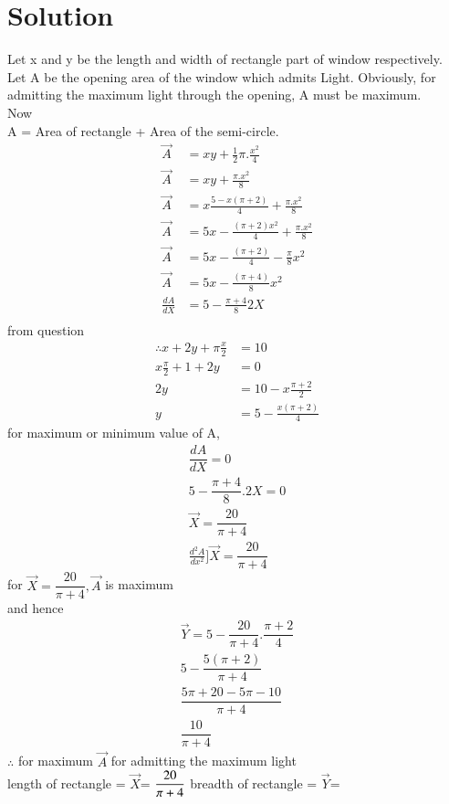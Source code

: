 \documentclass[journal,12pt,twocolumn]{IEEEtran}
\begin{document}
\section{Solution}
Let x and y be the length and width of rectangle part of window respectively.\\
Let A be the opening area of the window which admits Light. Obviously, for admitting the maximum light through the opening, A must be maximum.\\
Now \\A = Area of rectangle + Area of the semi-circle.
\begin{align}
    \vec A&= xy+\frac{1}{2}\pi.\frac{x^2}{4}\\
    \vec A&= xy+\frac{\pi.x^2}{8}\\
     \vec A&= x{\frac{5-x(\pi +2)}{4}}+\frac{\pi.x^2}{8}\\
     \vec A&= 5x -{\frac{(\pi +2)x^2}{4}}+\frac{\pi.x^2}{8}\\
     \vec A&= 5x -{\frac{(\pi +2)}{4}}-\frac{\pi}{8}x^2\\
     \vec A&= 5x -{\frac{(\pi +4)}{8}}x^2\\
     \frac{dA}{dX}&=5-\frac{\pi +4}{8}2X\\
     \end{align}
     from question
\begin{align}
\therefore x+2y+\pi \frac{x}{2}&=10\\
    x\frac{\pi}{2}+1+2y&=0\\
    2y&=10-x\frac{\pi +2}{2}\\
    y&=5-\frac{x(\pi +2)}{4}
\end{align}
for maximum or minimum value of \vec A,
\begin{align}
 \dfrac{dA}{dX}=0\\
 5- \dfrac{\pi+4}{8}.2X=0\\
    \vec X=\dfrac{20}{\pi+4}\\
    \frac{d^2A}{dx^2}\Bigg] \vec X=\dfrac{20}{\pi+4}
\end{align}
for $\vec X=\dfrac{20}{\pi+4}, \vec A$ is maximum\\
and hence \begin{align}
    \Vec{Y}=5-\dfrac{20}{\pi+4}.\dfrac{\pi+2}{4}\\
    5-\dfrac{5(\pi+2)}{\pi+4}\\
    \dfrac{5\pi+20-5\pi-10}{\pi+4}\\
    \dfrac{10}{\pi+4}
    \end{align} 
    $\therefore$  
    for maximum $\vec A$ for admitting the maximum light \\
    length of rectangle = $\vec X$= $\dfrac{20}{\pi+4}\\$
    breadth of rectangle = $\vec Y$=     
    
\end{document}
